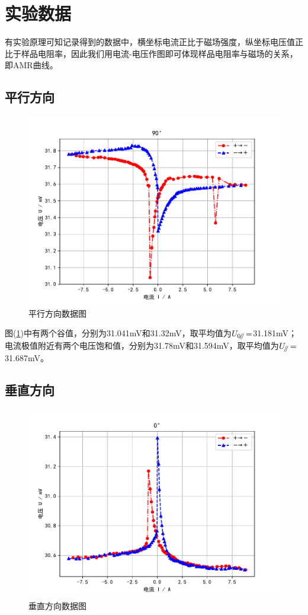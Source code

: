 \documentclass[a4paper]{article}
\newcommand{\parallelsum}{\mathbin{\!/\mkern-5mu/\!}}
\begin{document}
\section{实验数据}
有实验原理可知记录得到的数据中，横坐标电流正比于磁场强度，纵坐标电压值正比于样品电阻率，因此我们用电流-电压作图即可体现样品电阻率与磁场的关系，即AMR曲线。
\subsection{平行方向}

\begin{figure}[!h]
\centering
\includegraphics[width=1\textwidth]{fig/90.pdf}
\caption{平行方向数据图}\label{parallel}
\end{figure}

图(\ref{parallel})中有两个谷值，分别为31.041mV和31.32mV，取平均值为$U_{0\parallelsum}=$31.181mV；电流极值附近有两个电压饱和值，分别为31.78mV和31.594mV，取平均值为$U_{\parallelsum}=$31.687mV。

\subsection{垂直方向}
\begin{figure}[!h]
\centering
\includegraphics[width=1\textwidth]{fig/0.pdf}
\caption{垂直方向数据图}\label{perpendicular}
\end{figure}
\end{document}
